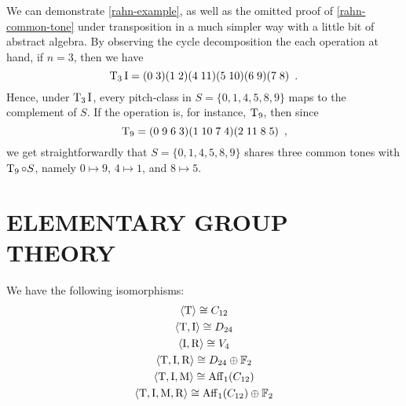 \begin{example}
	We can demonstrate \ref{rahn-example}, as well as the omitted proof of
	\ref{rahn-common-tone} under transposition in a much simpler way with a little bit
	of abstract algebra. By observing the cycle decomposition the each operation at hand,
	if $n = 3$, then we have
	\begin{equation}
		\operatorname{T}_3\operatorname{I} = (0 \; 3) (1 \; 2) (4 \; 11) (5 \; 10) (6 \; 9) (7 \; 8) \enspace.
	\end{equation}
	Hence, under $\operatorname{T}_3\operatorname{I}$, every pitch-class in $S = \{ 0, 1, 4, 5, 8, 9 \}$ maps to
	the complement of $S$. If the operation is, for instance, $\operatorname{T}_9$, then since
	\begin{equation}
		\operatorname{T}_9 = (0 \; 9 \; 6 \; 3) (1 \; 10 \; 7 \; 4) (2 \; 11 \; 8 \; 5) \enspace,
	\end{equation}
	we get straightforwardly that $S = \{ 0, 1, 4, 5, 8, 9 \}$ shares three common tones
	with $\operatorname{T}_9 \circ S$, namely $0 \mapsto 9$, $4 \mapsto 1$, and $8 \mapsto 5$.
\end{example}

\section{ELEMENTARY GROUP THEORY}


\begin{proposition}
	\cite[127]{FripertingerLackner2015}
	We have the following isomorphisms:
	\begin{gather}
		\langle \operatorname{T} \rangle \cong C_{12} \\
		\langle \operatorname{T}, \operatorname{I} \rangle \cong D_{24} \\
		\langle \operatorname{I}, \operatorname{R} \rangle \cong V_4 \\
		\langle \operatorname{T}, \operatorname{I}, \operatorname{R} \rangle \cong D_{24} \oplus \mathbb{F}_2 \\
		\langle \operatorname{T}, \operatorname{I}, \operatorname{M} \rangle \cong \operatorname{Aff}_1(C_{12}) \\
		\langle \operatorname{T}, \operatorname{I}, \operatorname{M}, \operatorname{R} \rangle \cong \operatorname{Aff}_1(C_{12}) \oplus \mathbb{F}_2
	\end{gather}
\end{proposition}
